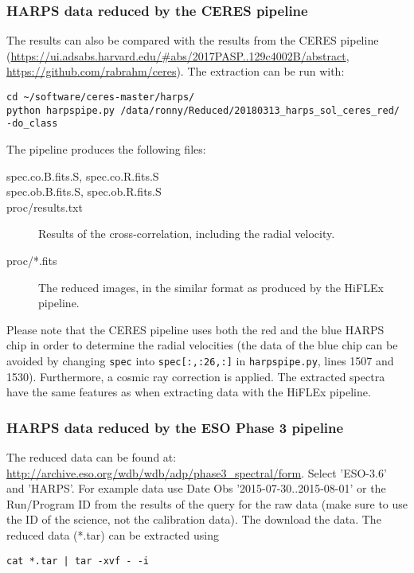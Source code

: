 \documentclass[10pt,a4paper]{article}
\begin{document}
\subsubsection{HARPS data reduced by the CERES pipeline}
The results can also be compared with the results from the CERES pipeline (\url{https://ui.adsabs.harvard.edu/#abs/2017PASP..129c4002B/abstract}, \url{https://github.com/rabrahm/ceres}). The extraction can be run with:
\begin{lstlisting}[style=base]
cd ~/software/ceres-master/harps/
python harpspipe.py /data/ronny/Reduced/20180313_harps_sol_ceres_red/ -do_class
\end{lstlisting}

The pipeline produces the following files:
\begin{description}
  \item[spec.co.B.fits.S, spec.co.R.fits.S] 
  \item[spec.ob.B.fits.S, spec.ob.R.fits.S] 
  \item[proc/results.txt] Results of the cross-correlation, including the radial velocity.
  \item[proc/*.fits] The reduced images, in the similar format as produced by the HiFLEx pipeline.
\end{description}

Please note that the CERES pipeline uses both the red and the blue HARPS chip in order to determine the radial velocities (the data of the blue chip can be avoided by changing \verb|spec| into \verb|spec[:,:26,:]| in \verb|harpspipe.py|, lines 1507 and 1530). Furthermore, a cosmic ray correction is applied. The extracted spectra have the same features as when extracting data with the HiFLEx pipeline.



\subsubsection{HARPS data reduced by the ESO Phase 3 pipeline}
The reduced data can be found at: \url{http://archive.eso.org/wdb/wdb/adp/phase3_spectral/form}. Select 'ESO-3.6' and 'HARPS'. For example data use Date Obs '2015-07-30..2015-08-01' or the Run/Program ID from the results of the query for the raw data (make sure to use the ID of the science, not the calibration data). The download the data. The reduced data (*.tar) can be extracted using
\begin{lstlisting}[style=base]
cat *.tar | tar -xvf - -i
\end{lstlisting}
\end{document}

